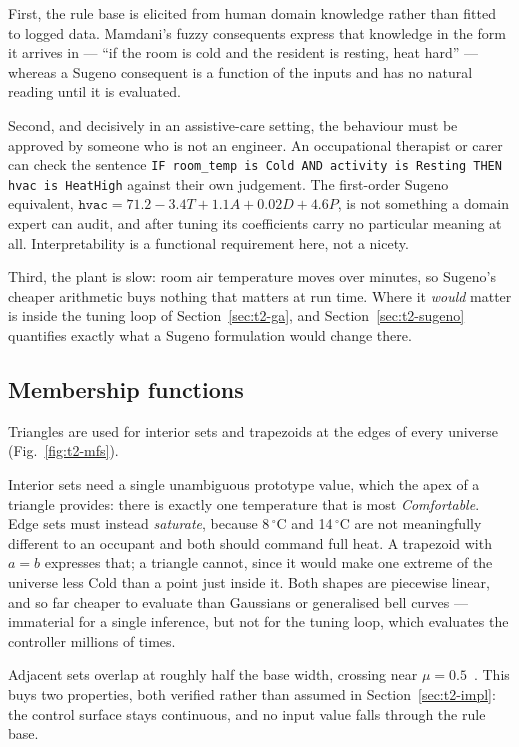 First, the rule base is elicited from human domain knowledge rather than fitted
to logged data. Mamdani's fuzzy consequents express that knowledge in the form
it arrives in --- ``if the room is cold and the resident is resting, heat
hard'' --- whereas a Sugeno consequent is a function of the inputs and has no
natural reading until it is evaluated.

Second, and decisively in an assistive-care setting, the behaviour must be
approved by someone who is not an engineer. An occupational therapist or carer
can check the sentence \texttt{IF room\_temp is Cold AND activity is Resting
THEN hvac is HeatHigh} against their own judgement. The first-order Sugeno
equivalent, $\texttt{hvac} = 71.2 - 3.4T + 1.1A + 0.02D + 4.6P$, is not
something a domain expert can audit, and after tuning its coefficients carry no
particular meaning at all. Interpretability is a functional requirement here,
not a nicety.

Third, the plant is slow: room air temperature moves over minutes, so Sugeno's
cheaper arithmetic buys nothing that matters at run time. Where it \emph{would}
matter is inside the tuning loop of Section~\ref{sec:t2-ga}, and
Section~\ref{sec:t2-sugeno} quantifies exactly what a Sugeno formulation would
change there.

\subsection{Membership functions}

Triangles are used for interior sets and trapezoids at the edges of every
universe (Fig.~\ref{fig:t2-mfs}).

Interior sets need a single unambiguous prototype value, which the apex of a
triangle provides: there is exactly one temperature that is most
\emph{Comfortable}. Edge sets must instead \emph{saturate}, because
8\,$^{\circ}$C and 14\,$^{\circ}$C are not meaningfully different to an occupant
and both should command full heat. A trapezoid with $a = b$ expresses that; a
triangle cannot, since it would make one extreme of the universe less Cold than
a point just inside it. Both shapes are piecewise linear, and so far cheaper to
evaluate than Gaussians or generalised bell curves --- immaterial for a single
inference, but not for the tuning loop, which evaluates the controller millions
of times.

Adjacent sets overlap at roughly half the base width, crossing near
$\mu = 0.5$~\cite{lee1990}. This buys two properties, both verified rather than
assumed in Section~\ref{sec:t2-impl}: the control surface stays continuous, and
no input value falls through the rule base.

